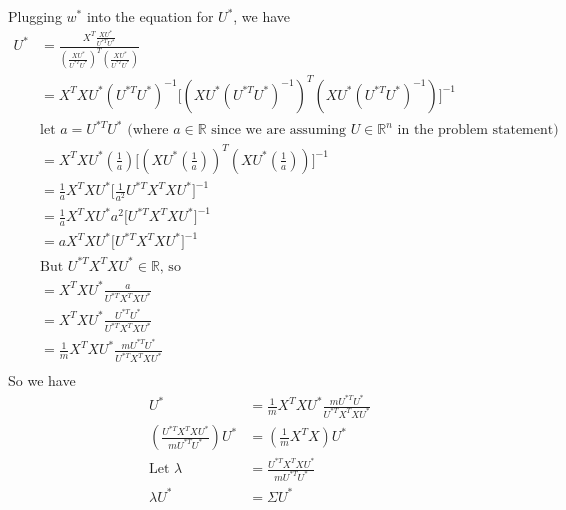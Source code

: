 \documentclass[11pt]{article}
\begin{document}
Plugging $w^*$ into the equation for $U^*$, we have
\begin{align*}
    U^* &= \frac{X^T \frac{XU^*}{U^{*T} U^*}}{(\frac{XU^*}{U^{*T}U^*})^T (\frac{XU^*}{U^{*T}U^*})} \\
        &= X^T X U^* (U^{*T} U^*)^{-1} \big[ (X U^* (U^{*T} U^*)^{-1})^T (X U^* (U^{*T} U^*)^{-1}) \big]^{-1} \\
        &\text{let $a = U^{*T} U^*$ (where $a \in \mathbb{R}$ since we are assuming $U \in \mathbb{R}^n$ in the problem statement)} \\
        &= X^T X U^* (\frac{1}{a}) \big[ (X U^* (\frac{1}{a}))^T (X U^* (\frac{1}{a})) \big]^{-1} \\
        &= \frac{1}{a} X^T X U^* \big[ \frac{1}{a^2} U^{*T} X^T X U^* \big]^{-1} \\
        &= \frac{1}{a} X^T X U^* a^2 \big[ U^{*T} X^T X U^* \big]^{-1} \\
        &= a X^T X U^* \big[ U^{*T} X^T X U^* \big]^{-1} \\
        &\text{But $U^{*T} X^T X U^* \in \mathbb{R}$, so} \\
        &= X^T X U^* \frac{a}{U^{*T} X^T X U^*} \\
        &= X^T X U^* \frac{U^{*T} U^*}{U^{*T} X^T X U^*} \\
        &= \frac{1}{m} X^T X U^* \frac{m U^{*T} U^*}{U^{*T} X^T X U^*} \\
\end{align*}
So we have
\begin{align*}
    U^* &= \frac{1}{m} X^T X U^* \frac{m U^{*T} U^*}{U^{*T} X^T X U^*} \\
    (\frac{U^{*T} X^T X U^*}{m U^{*T} U^*}) U^* &= (\frac{1}{m} X^T X) U^* \\
    \text{Let } \lambda &= \frac{U^{*T} X^T X U^*}{m U^{*T} U^*}\\
    \lambda U^* &= \Sigma U^* \\
\end{align*}
\end{document}
